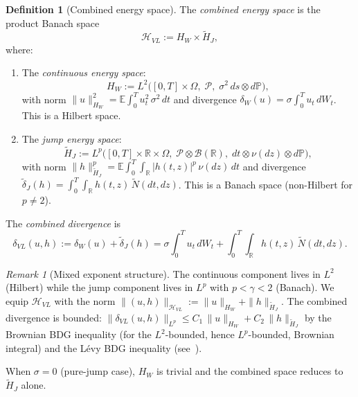 \documentclass[11pt,a4paper]{article}
\theoremstyle{plain}
\theoremstyle{definition}
\newtheorem{definition}[theorem]{Definition}
\theoremstyle{remark}
\newtheorem{remark}[theorem]{Remark}
\newcommand{\E}{\mathbb{E}}
\newcommand{\R}{\mathbb{R}}
\newcommand{\PP}{\mathbb{P}}
\newcommand{\HH}{\mathcal{H}}
\newcommand{\Ntilde}{\widetilde{N}}
\begin{document}
\begin{definition}[Combined energy space]\label{def:combined-energy}
The \emph{combined energy space} is the product Banach space
\begin{equation}\label{eq:HVL}
  \HH_{VL} := H_W \times \widetilde{H}_J,
\end{equation}
where:
\begin{enumerate}[label=(\roman*)]
\item The \emph{continuous energy space}:
  \begin{equation}\label{eq:HW}
    H_W := L^2\bigl([0,T] \times \Omega,\;
    \mathcal{P},\; \sigma^2\,ds \otimes d\PP\bigr),
  \end{equation}
  with norm
  $\|u\|_{H_W}^2 = \E\!\int_0^T u_t^2\,\sigma^2\,dt$
  and divergence
  $\delta_W(u) = \sigma\!\int_0^T u_t\,dW_t$.
  This is a Hilbert space.

\item The \emph{jump energy space}:
  \begin{equation}\label{eq:HJ}
    \widetilde{H}_J :=
    L^p\bigl([0,T] \times \R \times \Omega,\;
    \mathcal{P} \otimes \mathcal{B}(\R),\;
    dt \otimes \nu(dz) \otimes d\PP\bigr),
  \end{equation}
  with norm
  $\|h\|_{\widetilde{H}_J}^p = \E\!\int_0^T\!\!\int_\R
  |h(t,z)|^p\,\nu(dz)\,dt$
  and divergence
  $\widetilde{\delta}_J(h) = \int_0^T\!\!\int_\R
  h(t,z)\,\Ntilde(dt,dz)$.
  This is a Banach space (non-Hilbert for $p \neq 2$).
\end{enumerate}
The \emph{combined divergence} is
\begin{equation}\label{eq:delta-VL}
  \delta_{VL}(u,h) := \delta_W(u) + \widetilde{\delta}_J(h)
  = \sigma\!\int_0^T u_t\,dW_t
  + \int_0^T\!\!\int_\R h(t,z)\,\Ntilde(dt,dz).
\end{equation}
\end{definition}

\begin{remark}[Mixed exponent structure]\label{rem:mixed}
The continuous component lives in $L^2$ (Hilbert) while the jump
component lives in $L^p$ with $p < \gamma < 2$ (Banach).  We equip
$\HH_{VL}$ with the norm
$\|(u,h)\|_{\HH_{VL}} := \|u\|_{H_W} + \|h\|_{\widetilde{H}_J}$.
The combined divergence is bounded:
$\|\delta_{VL}(u,h)\|_{L^p} \leq
C_1\,\|u\|_{H_W} + C_2\,\|h\|_{\widetilde{H}_J}$
by the Brownian BDG inequality (for the $L^2$-bounded, hence
$L^p$-bounded, Brownian integral) and the L\'evy BDG inequality
(see~\cite{Dirksen2015}).

When $\sigma = 0$ (pure-jump case), $H_W$ is trivial and the
combined space reduces to $\widetilde{H}_J$ alone.
\end{remark}
\end{document}
